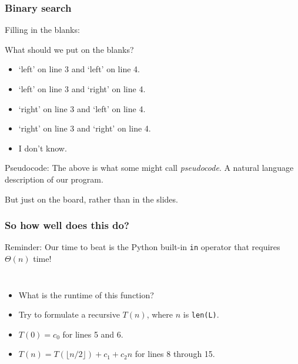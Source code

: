 \begin{frame}
	\frametitle{Binary search}

Filling in the blanks:

				What should we put on the blanks?
				
				\begin{itemize}
					\item `left' on line 3 and `left' on line 4. 
					\item `left' on line 3 and `right' on line 4. 
					\item `right' on line 3 and `left' on line 4. 
					\item `right' on line 3 and `right' on line 4. 
					\item I don't know.
				\end{itemize}	

Pseudocode:
				The above is what some might call \textit{pseudocode}. A natural language description of our program.			

				But just on the board, rather than in the slides.

\end{frame}

\begin{frame}
	\frametitle{So how well does this do?}

Reminder: 			Our time to beat is the Python built-in \texttt{in} operator that requires $\Theta(n)$ time!

		\begin{columns}
					
			
				\begin{itemize}
					\item What is the runtime of this function? 
					\item Try to formulate a recursive $T(n)$, where $n$ is \texttt{len(L)}.
					\item $T(0) = c_0$ for lines 5 and 6.
					\item $T(n) = T(\lfloor n/2 \rfloor) + c_1 + c_2n$ for lines 8 through 15.
			\end{itemize}
		\end{columns}
\end{frame}

